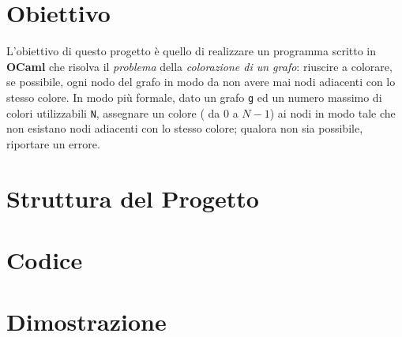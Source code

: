\section{Obiettivo}
L'obiettivo di questo progetto è quello di realizzare un programma scritto in \textbf{OCaml} che risolva il \textit{problema} della \textit{colorazione di un grafo}: riuscire a colorare, se possibile, ogni nodo del grafo in modo da non avere mai nodi adiacenti con lo stesso colore. In modo più formale, dato un grafo \lstinline[style=cmd]|g| ed un numero massimo di colori utilizzabili \lstinline[style=cmd]|N|, assegnare un colore ( da $0$ a $N-1$) ai nodi in modo tale che non esistano nodi adiacenti con lo stesso colore; qualora non sia possibile, riportare un errore.
 
\section{Struttura del Progetto}

\section{Codice}

\section{Dimostrazione}

		




